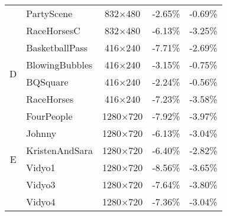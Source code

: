 \begin{table}[!p]
\begin{tabular}{@{}clccc@{}}
                                         & PartyScene                                & 832$\times$480          & -2.65\%                            & -0.69\%                    \\
                                         & RaceHorsesC                               & 832$\times$480          & -6.13\%                            & -3.25\%                    \\
        \multirow{4}{*}{D}               & BasketballPass                            & 416$\times$240          & -7.71\%                            & -2.69\%                    \\
                                         & BlowingBubbles                            & 416$\times$240          & -3.15\%                            & -0.75\%                    \\
                                         & BQSquare                                  & 416$\times$240          & -2.24\%                            & -0.56\%                    \\
                                         & RaceHorses                                & 416$\times$240          & -7.23\%                            & -3.58\%                    \\
        \multirow{6}{*}{E}               & FourPeople                                & 1280$\times$720         & -7.92\%                            & -3.97\%                    \\
                                         & Johnny                                    & 1280$\times$720         & -6.13\%                            & -3.04\%                    \\
                                         & KristenAndSara                            & 1280$\times$720         & -6.40\%                            & -2.82\%                    \\
                                         & Vidyo1                                    & 1280$\times$720         & -8.56\%                            & -3.65\%                    \\
                                         & Vidyo3                                    & 1280$\times$720         & -7.64\%                            & -3.80\%                    \\
                                         & Vidyo4                                    & 1280$\times$720         & -7.36\%                            & -3.04\%                    \\

\end{tabular}
\end{table}
